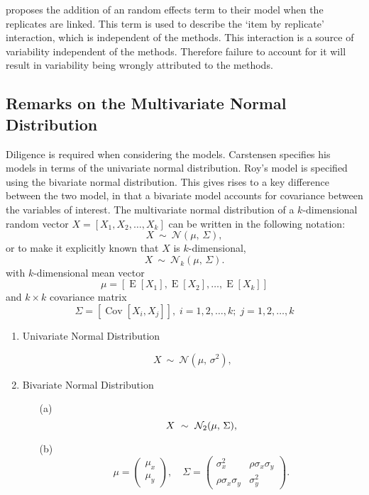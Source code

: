 \documentclass[12pt, a4paper]{report}
\theoremstyle{plain}
\theoremstyle{definition}
\theoremstyle{remark}
\begin{document}
\citet{BXC2008} proposes the addition of an random effects term to their model when the replicates are linked. This term is used to describe the `item by replicate' interaction, which is independent of the methods. This interaction is a source of variability independent of the methods. Therefore failure to account for it will result in variability being wrongly attributed to the methods.


\newpage

\subsection{Remarks on the Multivariate Normal Distribution}

Diligence is required when considering the models. Carstensen specifies his models in terms of the univariate normal distribution. Roy's model is specified using the bivariate normal distribution.
This gives rises to a key difference between the two model, in that a bivariate model accounts for covariance between the variables of interest.
The multivariate normal distribution of a $k$-dimensional random vector $X = [X_1, X_2, \ldots, X_k]$
can be written in the following notation:
\[
X\ \sim\ \mathcal{N}(\mu,\, \Sigma),
\]
or to make it explicitly known that $X$ is $k$-dimensional,
\[
X\ \sim\ \mathcal{N}_k(\mu,\, \Sigma).
\]
with $k$-dimensional mean vector
\[ \mu = [ \operatorname{E}[X_1], \operatorname{E}[X_2], \ldots, \operatorname{E}[X_k]] \]
and $k \times k$ covariance matrix
\[ \Sigma = [\operatorname{Cov}[X_i, X_j]], \; i=1,2,\ldots,k; \; j=1,2,\ldots,k \]

\bigskip

\begin{enumerate}
	\item Univariate Normal Distribution
	
	\[
	X\ \sim\ \mathcal{N}(\mu,\, \sigma^2),
	\]
	
	\item Bivariate Normal Distribution
	
	\begin{itemize}
		\item[(a)] \[  X\ \sim\ \mathcal{N}_2(\mu,\, \Sigma), \vspace{1cm}\]
		\item[(b)] \[    \mu = \begin{pmatrix} \mu_x \\ \mu_y \end{pmatrix}, \quad
		\Sigma = \begin{pmatrix} \sigma_x^2 & \rho \sigma_x \sigma_y \\
		\rho \sigma_x \sigma_y  & \sigma_y^2 \end{pmatrix}.\]
	\end{itemize}
\end{enumerate}

\end{document}
